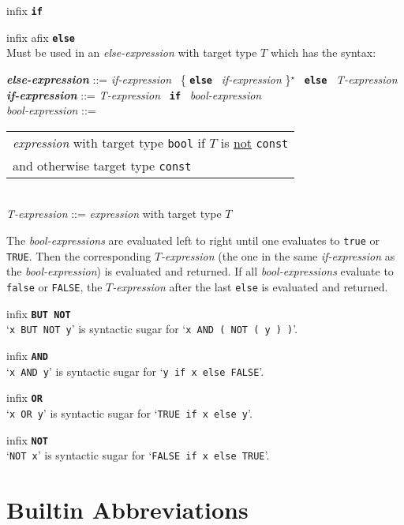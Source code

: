 \documentclass[12pt]{article}
\newcommand{\TT}[1]{{\tt \bfseries #1}}
\newcommand{\STAR}{{\Large $^\star$}}
\newcommand{\ttkey}[1]{{\tt \bfseries #1}}
\newcommand{\emkey}[1]{{\em \bfseries #1}}
\newenvironment{indpar}[1][0.3in]%
	{\begin{list}{}%
		     {\setlength{\itemsep}{0in}%
		      \setlength{\topsep}{0in}%
		      \setlength{\parsep}{1ex}%
		      \setlength{\labelwidth}{#1}%
		      \setlength{\leftmargin}{#1}%
		      \addtolength{\leftmargin}{\labelsep}}%
	 \item}%
	{\end{list}}
\newenvironment{itemlist}[1][1.2in]%
	{\begin{list}{}{\setlength{\labelwidth}{#1}%
		        \setlength{\leftmargin}{\labelwidth}%
		        \addtolength{\leftmargin}{+0.2in}%
		        \renewcommand{\makelabel}[1]{##1\hfill}}}%
	{\end{list}}
\begin{document}
\begin{itemlist}[0.2in]
\item[infix \TT{if}]
\item[infix afix \TT{else}] \vspace*{-0.15in} ~\\
Must be used in an {\em else-expression} with target
type $T$ which has the syntax:
\begin{indpar}[0.2in]
\emkey{else-expression} ::=
    {\em if-expression}~ \{ \ttkey{else}~ {\em if-expression} \}\STAR{}~
    \ttkey{else}~ {\em T-expression} 
\\[0.5ex]
\emkey{if-expression} ::=
    {\em T-expression}~ \ttkey{if}~ {\em bool-expression}
\\[0.5ex]
{\em bool-expression} ::=
    \begin{tabular}[t]{@{}l@{}}
    {\em expression} with target type {\tt bool}
	if $T$ is \underline{not} {\tt const} \\
    and otherwise target type {\tt const}
    \end{tabular}
\\[0.5ex]
{\em T-expression} ::= {\em expression} with target type $T$
\end{indpar}
The {\em bool-expressions} are evaluated left to right until one
evaluates to {\tt true} or {\tt TRUE}.
Then the corresponding {\em $T$-expression}
(the one in the same {\em if-expression} as the {\em bool-expression})
is evaluated and returned.  If all {\em bool-expressions} evaluate to
{\tt false} or {\tt FALSE}, the {\em $T$-expression} after the last {\tt else}
is evaluated and returned.

\item[infix \TT{BUT NOT}] ~\\
`{\tt x BUT NOT y}' is syntactic sugar for `{\tt x AND ( NOT ( y ) )}'.

\item[infix \TT{AND}] ~\\
`{\tt x AND y}' is syntactic sugar for `{\tt y if x else FALSE}'.

\item[infix \TT{OR}] ~\\
`{\tt x OR y}' is syntactic sugar for `{\tt TRUE if x else y}'.

\item[infix \TT{NOT}] ~\\
`{\tt NOT x}' is syntactic sugar for `{\tt FALSE if x else TRUE}'.

\end{itemlist}

\section{Builtin Abbreviations}
\end{document}

